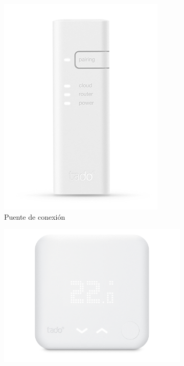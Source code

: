 \documentclass[spanish,12pt, a4paper, twoside]{paper}
\begin{document}
\begin{figure}[htp]
\begin{subfigure}{0.5\textwidth}
\includegraphics[width=\textwidth]{recursos/bridge.jpg}
\caption{Puente de conexión}
\label{fig:bridge tado}
\end{subfigure}
\begin{subfigure}{0.5\textwidth}
\includegraphics[width=\textwidth]{recursos/termostato.jpeg}

\end{subfigure}
\end{figure}
\end{document}
